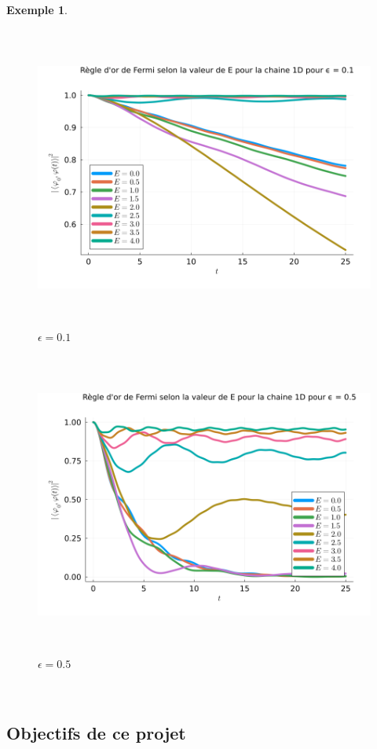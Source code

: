 \documentclass[12pt,openany,a4paper, titlepage]{article}
\theoremstyle{definition}
\theoremstyle{definition}
\theoremstyle{definition}
\newtheorem{ex}{Exemple}
\theoremstyle{definition}
\theoremstyle{definition}
\theoremstyle{definition}
\begin{document}
\begin{ex}
\begin{figure}[h]
    \centering
        \includegraphics[height=10cm]{Règle d'or de Fermi pour la chaine 1D pour ϵ = 0,1.png}
        \caption{$\epsilon = 0.1$}
\end{figure}

\begin{figure}[h]
    \centering
        \includegraphics[height=10cm]{Règle d'or de Fermi pour la chaine 1D pour ϵ = 0,5.png}
        \caption{$\epsilon = 0.5$}
\end{figure}
\end{ex}


\mbox{~}
\clearpage
\newpage
\subsection{Objectifs de ce projet}
\end{document}
